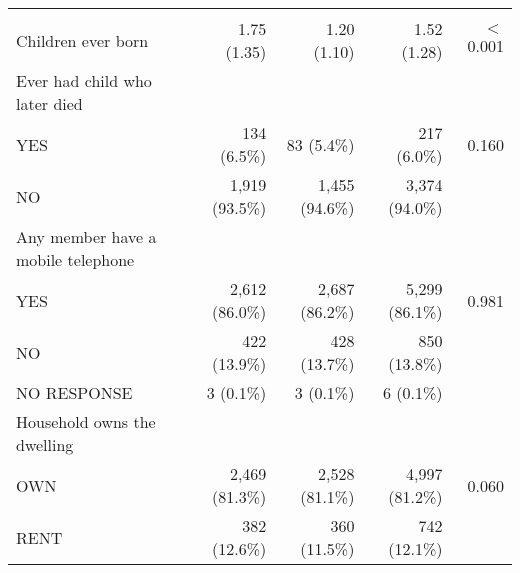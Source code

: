 \documentclass{article}
\begin{document}
\begin{table}[!h]
\begin{tabular}{lllll}
  \multicolumn{1}{r}{} \\
\multicolumn{1}{l}{Children ever born} &
  \multicolumn{1}{r}{1.75 (1.35)} &
  \multicolumn{1}{r}{1.20 (1.10)} &
  \multicolumn{1}{r}{1.52 (1.28)} &
  \multicolumn{1}{r}{$<$0.001} \\
\multicolumn{1}{l}{Ever had child who later died} &
  \multicolumn{1}{r}{} &
  \multicolumn{1}{r}{} &
  \multicolumn{1}{r}{} &
  \multicolumn{1}{r}{} \\
\multicolumn{1}{l}{\hspace{1em}YES} &
  \multicolumn{1}{r}{134 (6.5\%)} &
  \multicolumn{1}{r}{83 (5.4\%)} &
  \multicolumn{1}{r}{217 (6.0\%)} &
  \multicolumn{1}{r}{0.160} \\
\multicolumn{1}{l}{\hspace{1em}NO} &
  \multicolumn{1}{r}{1,919 (93.5\%)} &
  \multicolumn{1}{r}{1,455 (94.6\%)} &
  \multicolumn{1}{r}{3,374 (94.0\%)} &
  \multicolumn{1}{r}{} \\
\multicolumn{1}{l}{Any member have a mobile telephone} &
  \multicolumn{1}{r}{} &
  \multicolumn{1}{r}{} &
  \multicolumn{1}{r}{} &
  \multicolumn{1}{r}{} \\
\multicolumn{1}{l}{\hspace{1em}YES} &
  \multicolumn{1}{r}{2,612 (86.0\%)} &
  \multicolumn{1}{r}{2,687 (86.2\%)} &
  \multicolumn{1}{r}{5,299 (86.1\%)} &
  \multicolumn{1}{r}{0.981} \\
\multicolumn{1}{l}{\hspace{1em}NO} &
  \multicolumn{1}{r}{422 (13.9\%)} &
  \multicolumn{1}{r}{428 (13.7\%)} &
  \multicolumn{1}{r}{850 (13.8\%)} &
  \multicolumn{1}{r}{} \\
\multicolumn{1}{l}{\hspace{1em}NO RESPONSE} &
  \multicolumn{1}{r}{3 (0.1\%)} &
  \multicolumn{1}{r}{3 (0.1\%)} &
  \multicolumn{1}{r}{6 (0.1\%)} &
  \multicolumn{1}{r}{} \\
\multicolumn{1}{l}{Household owns the dwelling} &
  \multicolumn{1}{r}{} &
  \multicolumn{1}{r}{} &
  \multicolumn{1}{r}{} &
  \multicolumn{1}{r}{} \\
\multicolumn{1}{l}{\hspace{1em}OWN} &
  \multicolumn{1}{r}{2,469 (81.3\%)} &
  \multicolumn{1}{r}{2,528 (81.1\%)} &
  \multicolumn{1}{r}{4,997 (81.2\%)} &
  \multicolumn{1}{r}{0.060} \\
\multicolumn{1}{l}{\hspace{1em}RENT} &
  \multicolumn{1}{r}{382 (12.6\%)} &
  \multicolumn{1}{r}{360 (11.5\%)} &
  \multicolumn{1}{r}{742 (12.1\%)} &

\end{tabular}
\end{table}
\end{document}
